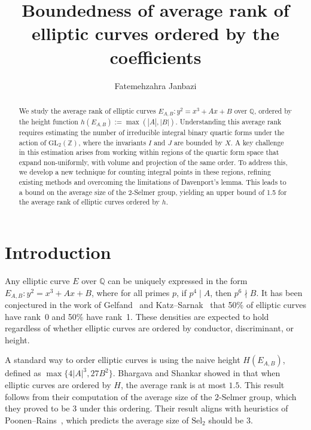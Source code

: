 \documentclass{article}
\author{Fatemehzahra Janbazi}
\title{Boundedness of average rank of elliptic curves ordered by the coefficients}
\begin{document}
\maketitle
\begin{abstract}
We study the average rank of elliptic curves $E_{A,B} : y^2 = x^3 + Ax + B$ over $\mathbb{Q}$, ordered by the height function $h(E_{A,B}) := \max(|A|, |B|)$. Understanding this average rank requires estimating the number of irreducible integral binary quartic forms under the action of $\mathrm{GL}_2(\mathbb{Z})$, where the invariants $I$ and $J$ are bounded by $X$. A key challenge in this estimation arises from working within regions of the quartic form space that expand non-uniformly, with volume and projection of the same order. To address this, we develop a new technique for counting integral points in these regions, refining existing methods and overcoming the limitations of Davenport’s lemma. This leads to a bound on the average size of the 2-Selmer group, yielding an upper bound of 1.5 for the average rank of elliptic curves ordered by $h$.
\end{abstract}

 
\section{Introduction} 
Any elliptic curve $E$ over $\mathbb{Q}$ can be uniquely expressed in the form  $E_{A,B}: y^2 = x^3 + Ax + B$, where for all primes $p$, if $p^4 \mid A$, then $p^6 \nmid B$.   
It has been conjectured in the work of Gelfand~\cite{golfand} and Katz--Sarnak~\cite{katz} that 50\% of elliptic curves have rank~0 and 50\% have rank~1.
 These densities are expected to hold regardless of whether elliptic curves are ordered by conductor, discriminant, or height. 

A standard way to order elliptic curves is using the naive height $H(E_{A,B})$, defined as $\max\{4|A|^3, 27B^2\}$.
Bhargava and Shankar showed in \cite{main} that when elliptic curves are ordered by $H$, the average rank is at most $1.5$. This result follows from their computation of the average size of the $2$-Selmer group, which they proved to be $3$ under this ordering. Their result aligns with heuristics of Poonen--Rains~\cite{PoonenRains}, which predicts  the average size of $\text{Sel}_2$ should be $3$.  
\end{document}
